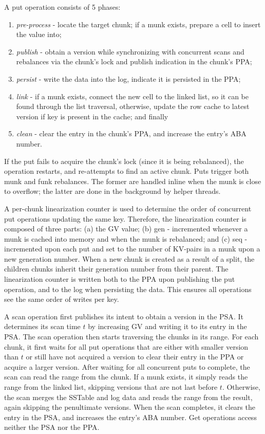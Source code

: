 \documentclass[letterpaper,twocolumn,10pt]{article}
\newcommand{\code}[1]{\textsf{\fontsize{9}{11}\selectfont #1}}
\begin{document}
A put operation consists of 5 phases: 
\begin{enumerate}\itemsep0pt
\item \emph{pre-process} - locate the target chunk; if a munk exists, prepare a cell to insert the value into; 
\item \emph{publish} - obtain a version while synchronizing with concurrent scans and rebalances via the chunk's lock and publish indication in the chunk's \code{PPA}; 
\item \emph{persist} - write the data into the log, indicate it is persisted in the \code{PPA}; 
\item \emph{link} - if a munk exists, connect the new cell to the linked list, so it can be found through the list traversal, otherwise, update the row cache to latest version if key is present in the cache; and finally
\item \emph{clean} - clear the entry in the chunk's \code{PPA}, and increase the entry's ABA number.
\end{enumerate}

If the put fails to acquire the chunk's lock (since it is being rebalanced), the operation restarts, and re-attempts to find an active chunk.
Puts trigger both munk and funk rebalances. The former are handled inline when the munk is close to overflow; the latter are done in the background 
by helper threads.

A per-chunk linearization counter is used to determine the order of concurrent put operations updating the same key.  
Therefore, the linearization counter is composed of three parts: (a) the GV value; (b) \code{gen} - incremented whenever a munk is cached into memory and when the munk is rebalanced; and (c) \code{seq} - incremented upon each put and set to the number of KV-pairs in a munk upon a new generation number. When a new chunk is created as a result of a split, the children chunks inherit their generation number from their parent. The linearization counter is written both to the \code{PPA} upon publishing the put operation, and to the \code{log} when persisting the data. This ensures all operations see the same order of writes per key.

A scan operation first publishes its intent to obtain a version in the \code{PSA}. It determines its scan time $t$ by increasing GV and writing it to its entry in the \code{PSA}. The scan operation then starts traversing the chunks in its range. For each chunk, it first waits for all put operations that are either with smaller version than $t$ or still have not acquired a version to clear their entry in the \code{PPA} or acquire a larger version. After waiting for all concurrent puts to complete, the scan  can read the range from the chunk. If a munk exists, it simply reads the range from the linked list, skipping versions that are not last before $t$. Otherwise, the scan merges the \code{SSTable} and \code{log} data and reads the range from the result, again skipping the penultimate versions. When the scan completes, it clears the entry in the \code{PSA}, and increases the entry's ABA number. Get operations access neither the \code{PSA} nor the \code{PPA}.%
\end{document}
